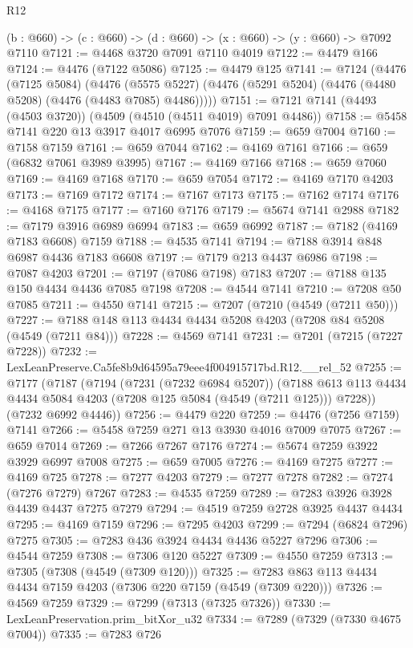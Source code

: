 \begin{lexlean}{R12}
\begin{coremodule}
  (b : @660) -> (c : @660) -> (d : @660) -> (x : @660) -> (y : @660) -> @7092 @7110
@7121 := @4468 @3720 @7091 @7110 @4019
@7122 := @4479 @166
@7124 := @4476 (@7122 @5086)
@7125 := @4479 @125
@7141 := @7124
    (@4476
      (@7125 @5084)
      (@4476 (@5575 @5227) (@4476 (@5291 @5204) (@4476 (@4480 @5208) (@4476 (@4483 @7085) @4486)))))
@7151 := @7121 @7141 (@4493 (@4503 @3720)) (@4509 (@4510 (@4511 @4019) @7091 @4486))
@7158 := @5458 @7141 @220 @13 @3917 @4017 @6995 @7076
@7159 := @659 @7004
@7160 := @7158 @7159
@7161 := @659 @7044
@7162 := @4169 @7161
@7166 := @659 (@6832 @7061 @3989 @3995)
@7167 := @4169 @7166
@7168 := @659 @7060
@7169 := @4169 @7168
@7170 := @659 @7054
@7172 := @4169 @7170 @4203
@7173 := @7169 @7172
@7174 := @7167 @7173
@7175 := @7162 @7174
@7176 := @4168 @7175
@7177 := @7160 @7176
@7179 := @5674 @7141 @2988
@7182 := @7179 @3916 @6989 @6994
@7183 := @659 @6992
@7187 := @7182 (@4169 @7183 @6608) @7159
@7188 := @4535 @7141
@7194 := @7188 @3914 @848 @6987 @4436 @7183 @6608
@7197 := @7179 @213 @4437 @6986
@7198 := @7087 @4203
@7201 := @7197 (@7086 @7198) @7183
@7207 := @7188 @135 @150 @4434 @4436 @7085 @7198
@7208 := @4544 @7141
@7210 := @7208 @50 @7085
@7211 := @4550 @7141
@7215 := @7207 (@7210 (@4549 (@7211 @50)))
@7227 := @7188 @148 @113 @4434 @4434 @5208 @4203 (@7208 @84 @5208 (@4549 (@7211 @84)))
@7228 := @4569 @7141
@7231 := @7201 (@7215 (@7227 @7228))
@7232 := LexLeanPreserve.Ca5fe8b9d64595a79eee4f004915717bd.R12.__rel_52
@7255 := @7177
    (@7187
      (@7194
        (@7231 (@7232 @6984 @5207))
        (@7188 @613 @113 @4434 @4434 @5084 @4203 (@7208 @125 @5084 (@4549 (@7211 @125))) @7228))
      (@7232 @6992 @4446))
@7256 := @4479 @220
@7259 := @4476 (@7256 @7159) @7141
@7266 := @5458 @7259 @271 @13 @3930 @4016 @7009 @7075
@7267 := @659 @7014
@7269 := @7266 @7267 @7176
@7274 := @5674 @7259 @3922 @3929 @6997 @7008
@7275 := @659 @7005
@7276 := @4169 @7275
@7277 := @4169 @725
@7278 := @7277 @4203
@7279 := @7277 @7278
@7282 := @7274 (@7276 @7279) @7267
@7283 := @4535 @7259
@7289 := @7283 @3926 @3928 @4439 @4437 @7275 @7279
@7294 := @4519 @7259 @2728 @3925 @4437 @4434
@7295 := @4169 @7159
@7296 := @7295 @4203
@7299 := @7294 (@6824 @7296) @7275
@7305 := @7283 @436 @3924 @4434 @4436 @5227 @7296
@7306 := @4544 @7259
@7308 := @7306 @120 @5227
@7309 := @4550 @7259
@7313 := @7305 (@7308 (@4549 (@7309 @120)))
@7325 := @7283 @863 @113 @4434 @4434 @7159 @4203 (@7306 @220 @7159 (@4549 (@7309 @220)))
@7326 := @4569 @7259
@7329 := @7299 (@7313 (@7325 @7326))
@7330 := LexLeanPreservation.prim_bitXor_u32
@7334 := @7289 (@7329 (@7330 @4675 @7004))
@7335 := @7283 @726

\end{coremodule}
\end{lexlean}

